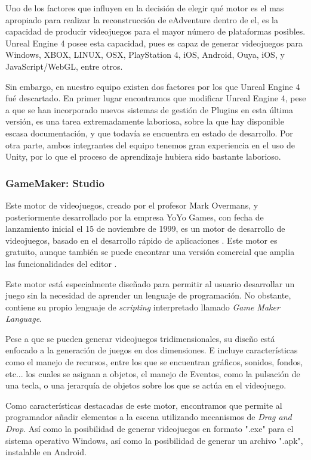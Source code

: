 Uno de los factores que influyen en la decisión de elegir qué motor es el mas apropiado para realizar la reconstrucción de eAdventure dentro de el, es la capacidad de producir videojuegos para el mayor número de plataformas posibles. Unreal Engine 4 posee esta capacidad, pues es capaz de generar videojuegos para Windows, XBOX, LINUX, OSX, PlayStation 4, iOS, Android, Ouya, iOS, y JavaScript/WebGL, entre otros.

Sin embargo, en nuestro equipo existen dos factores por los que Unreal Engine 4 fué descartado. En primer lugar encontramos que modificar Unreal Engine 4, pese a que se han incorporado nuevos sistemas de gestión de Plugins en esta última versión, es una tarea extremadamente laboriosa, sobre la que hay disponible escasa documentación, y que todavía se encuentra en estado de desarrollo. Por otra parte, ambos integrantes del equipo tenemos gran experiencia en el uso de Unity, por lo que el proceso de aprendizaje hubiera sido bastante laborioso.

\subsubsection{GameMaker: Studio}

Este motor de videojuegos, creado por el profesor Mark Overmans, y posteriormente desarrollado por la empresa YoYo Games, con fecha de lanzamiento inicial el 15 de noviembre de 1999, es un motor de desarrollo de videojuegos, basado en el desarrollo rápido de aplicaciones \cite{gamemaker}. Este motor es gratuito, aunque también se puede encontrar una versión comercial que amplia las funcionalidades del editor \cite{gamemaker}.

Este motor está especialmente diseñado para permitir al usuario desarrollar un juego sin la necesidad de aprender un lenguaje de programación. No obstante, contiene su propio lenguaje de \textit{scripting} interpretado llamado \textit{Game Maker Language}.

Pese a que se pueden generar videojuegos tridimensionales, su diseño está enfocado a la generación de juegos en dos dimensiones. E incluye características como el manejo de recursos, entre los que se encuentran gráficos, sonidos, fondos, etc... los cuales se asignan a objetos, el manejo de Eventos, como la pulsación de una tecla, o una jerarquía de objetos sobre los que se actúa en el videojuego.

Como características destacadas de este motor, encontramos que permite al programador añadir elementos a la escena utilizando mecanismos de \textit{Drag and Drop}. Así como la posibilidad de generar videojuegos en formato ".exe" para el sistema operativo Windows, así como la posibilidad de generar un archivo ".apk", instalable en Android.

